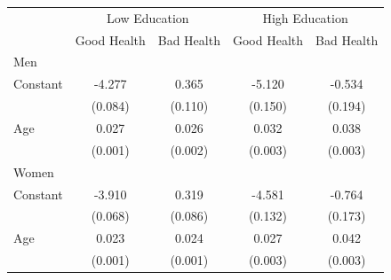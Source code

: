 \begin{tabular}{lcccc}
    \toprule
     & \multicolumn{2}{c}{Low Education} & \multicolumn{2}{c}{High Education} \\
     & Good Health & Bad Health & Good Health & Bad Health \\
    \midrule
    Men & & & & \\
    \midrule
    Constant & -4.277 & 0.365 & -5.120 & -0.534 \\
     & (0.084) & (0.110) & (0.150) & (0.194) \\
    Age & 0.027 & 0.026 & 0.032 & 0.038 \\
     & (0.001) & (0.002) & (0.003) & (0.003) \\
    \midrule
    Women & & & & \\
    \midrule
    Constant & -3.910 & 0.319 & -4.581 & -0.764 \\
     & (0.068) & (0.086) & (0.132) & (0.173) \\
    Age & 0.023 & 0.024 & 0.027 & 0.042 \\
     & (0.001) & (0.001) & (0.003) & (0.003) \\
    \bottomrule
\end{tabular}
